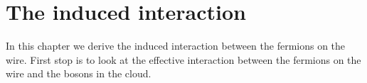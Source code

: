 
\chapter{The induced interaction} %

\label{Chapter3} %


In this chapter we derive the induced interaction between the fermions on the wire. First stop is to look at the effective interaction between the fermions on the wire and the bosons in the cloud.
